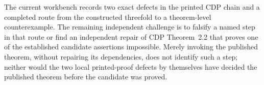 \begin{test}\label{obl:cdp-comparison}
The current workbench records two exact defects in the printed CDP chain and
a completed route from the constructed threefold to a theorem-level
counterexample.  The remaining independent challenge is to falsify a named
step in that route or find an independent repair of CDP Theorem~2.2 that
proves one of the established candidate assertions impossible.  Merely
invoking the published theorem, without repairing its dependencies, does not
identify such a step; neither would the two local printed-proof defects by
themselves have decided the published theorem before the candidate was
proved.
\end{test}
